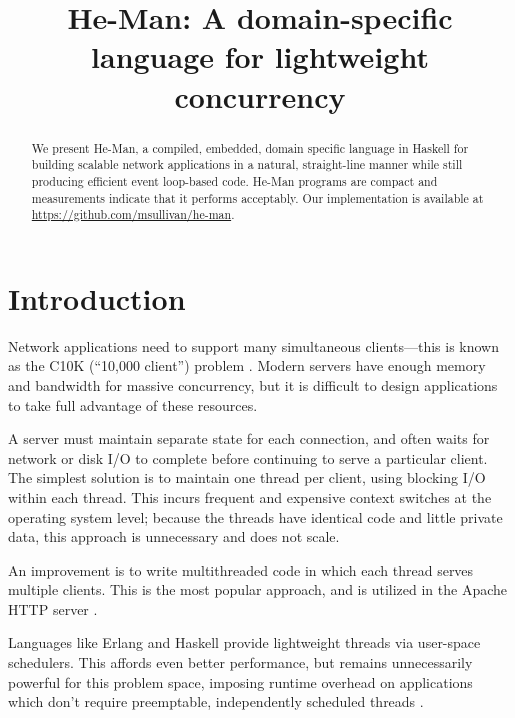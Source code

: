 \documentclass[preprint,10pt]{sigplanconf}
\title{He-Man: A domain-specific language for lightweight concurrency}
\begin{document}
\maketitle


\begin{abstract}

We present He-Man, a compiled, embedded, domain specific language in Haskell for
building scalable network applications in a natural, straight-line manner while
still producing efficient event loop-based code. He-Man programs are compact and
measurements indicate that it performs acceptably. Our implementation is
available at
\url{https://github.com/msullivan/he-man}.
\end{abstract}

\section{Introduction}

Network applications need to support many simultaneous clients---this is known
as the C10K (``10,000 client'') problem \cite{Kegel}. Modern servers have enough
memory and bandwidth for massive concurrency, but it is difficult to design
applications to take full advantage of these resources.

A server must maintain separate state for each connection, and often waits for
network or disk I/O to complete before continuing to serve a particular client.
The simplest solution is to maintain one thread per client, using blocking I/O
within each thread. This incurs frequent and expensive context switches at the
operating system level; because the threads have identical code and little
private data, this approach is unnecessary and does not scale.

An improvement is to write multithreaded code in which each thread serves
multiple clients. This is the most popular approach, and is utilized in the
Apache HTTP server \cite{Apache}.

Languages like Erlang and Haskell provide lightweight threads via user-space
schedulers. This affords even better performance, but remains unnecessarily
powerful for this problem space, imposing runtime overhead on applications which
don't require preemptable, independently scheduled threads \cite{Vinoski}.
\end{document}
